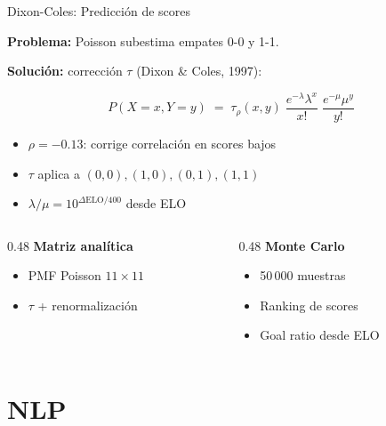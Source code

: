 \documentclass[aspectratio=169,10pt]{beamer}
\begin{document}
\begin{frame}{Dixon-Coles: Predicción de scores}

  \textbf{Problema:} Poisson subestima empates 0-0 y 1-1.

  \vspace{0.2cm}
  \textbf{Solución:} corrección $\tau$ (Dixon \& Coles, 1997):

  \[
  P(X{=}x, Y{=}y) \;=\; \tau_{\rho}(x,y)\;
  \frac{e^{-\lambda}\lambda^x}{x!}\;
  \frac{e^{-\mu}\mu^y}{y!}
  \]

  \begin{itemize}
    \item $\rho = -0.13$: corrige correlación en scores bajos
    \item $\tau$ aplica a $(0,0), (1,0), (0,1), (1,1)$
    \item $\lambda/\mu = 10^{\Delta\text{ELO}/400}$ desde ELO
  \end{itemize}

  \vspace{0.2cm}
  \begin{columns}[T]
    \begin{column}{0.48\textwidth}
      \textbf{Matriz analítica}
      \begin{itemize}\small
        \item PMF Poisson $11\times11$
        \item $\tau$ + renormalización
      \end{itemize}
    \end{column}
    \begin{column}{0.48\textwidth}
      \textbf{Monte Carlo}
      \begin{itemize}\small
        \item 50\,000 muestras
        \item Ranking de scores
        \item Goal ratio desde ELO
      \end{itemize}
    \end{column}
  \end{columns}
\end{frame}

\section{NLP}
\end{document}
